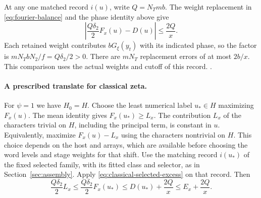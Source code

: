 At any one matched record \(i(u)\), write \(Q=N_Tmb\). The weight
replacement in \eqref{eq:fourier-balance} and the phase identity above
give
\begin{equation}
\label{eq:fourier-one-translate}
 \left|\frac{Q\delta_2}{2}F_x(u)-D(u)\right|\le\frac{2Q}{x}.
\end{equation}
Each retained weight contributes \(bG_\xi(y_t)\) with its indicated phase,
so the factor is \(mN_TbN_2/f=Q\delta_2/2>0\). There are \(mN_T\)
replacement errors of at most \(2b/x\). This comparison uses the actual
weights and cutoff of this record.
.

\paragraph{A prescribed translate for classical zeta.}
%
For \(\psi=1\) we have \(H_0=H\). Choose the least numerical label
\(u_*\in H\) maximizing \(F_x(u)\). The mean identity gives
\(F_x(u_*)\ge L_x\). The contribution \(L_x\) of the characters trivial
on \(H\), including the principal term, is constant in \(u\). Equivalently,
maximize \(F_x(u)-L_x\) using the characters nontrivial on \(H\).
This choice depends on the host and arrays, which
are available before choosing the word levels and stage weights for that
shift. Use the matching record \(i(u_*)\) of the fixed selected family,
with its fitted class and selector, as in Section~\ref{sec:assembly}.
Apply \eqref{eq:classical-selected-excess} on that record. Then
\begin{equation}
\label{eq:classical-numerical-upper}
 \frac{Q\delta_2}{2}L_x\le \frac{Q\delta_2}{2}F_x(u_*)
                      \le D(u_*)+\frac{2Q}{x}\le E_x+\frac{2Q}{x}.
\end{equation}

